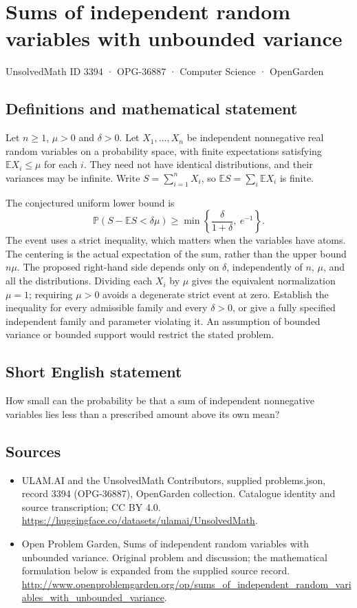 \documentclass[11pt,a4paper]{article}
\begin{document}
\section*{Sums of independent random variables with unbounded variance}\label{3394}
{\small UnsolvedMath ID 3394 · OPG-36887 · Computer Science · OpenGarden}
\subsection{Definitions and mathematical statement}
Let $n\ge1$, $\mu>0$ and $\delta>0$. Let $X_1,\ldots,X_n$ be
independent nonnegative real random variables on a probability space,
with finite expectations satisfying $\mathbb E X_i\le\mu$ for each
$i$. They need not have identical distributions, and their variances
may be infinite. Write $S=\sum_{i=1}^n X_i$, so
$\mathbb E S=\sum_i\mathbb E X_i$ is finite.

The conjectured uniform lower bound is
\[
 \mathbb P(S-\mathbb E S<\delta\mu)
            \ge \min\left\{\frac{\delta}{1+\delta},\ e^{-1}\right\}.
\]
The event uses a strict inequality, which matters when the variables
have atoms. The centering is the actual expectation of the sum,
rather than the upper bound $n\mu$. The proposed right-hand side
depends only on $\delta$, independently of $n$, $\mu$, and all
the distributions. Dividing each $X_i$ by $\mu$ gives the equivalent
normalization $\mu=1$; requiring $\mu>0$ avoids a degenerate strict
event at zero.
Establish the inequality for every admissible family and every
$\delta>0$, or give a fully specified independent family and
parameter violating it. An assumption of bounded variance or
bounded support would restrict the stated problem.
\subsection{Short English statement}
How small can the probability be that a sum of independent nonnegative variables lies less than a prescribed amount above its own mean?
\subsection{Sources}
\begin{itemize}
\item[S1] ULAM.AI and the UnsolvedMath Contributors, supplied problems.json, record 3394 (OPG-36887), OpenGarden collection. Catalogue identity and source transcription; CC BY 4.0.
\url{https://huggingface.co/datasets/ulamai/UnsolvedMath}.
\item[S2] Open Problem Garden, Sums of independent random variables with unbounded variance. Original problem and discussion; the mathematical formulation below is expanded from the supplied source record.
\url{http://www.openproblemgarden.org/op/sums_of_independent_random_variables_with_unbounded_variance}.
\end{itemize}
\end{document}
